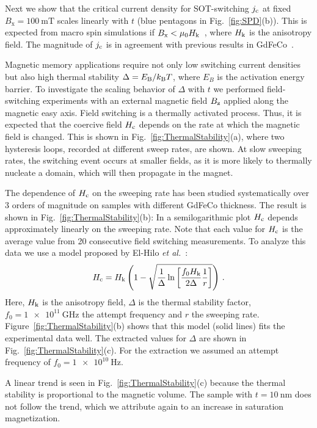 \documentclass[aps,prb,superscriptaddress,sd,reprint]{revtex4-1}
\begin{document}
Next we show that the critical current density for SOT-switching $j_\text c$ at fixed $B_\text{x}=\SI{100}{\milli\tesla}$ scales linearly with $t$ (blue pentagons in Fig.~\ref{fig:SPD}(b)). This is expected from macro spin simulations if $B_\text{x}< \mu_0 H_\text k$~\cite{Lee2013}, where $H_\text k$ is the anisotropy field. The magnitude of $j_\text c$ is in agreement with previous results in GdFeCo~\cite{Roschewsky2016}.

Magnetic memory applications require not only low switching current densities but also high thermal stability $\Delta=E_\text B/k_\text B T$, where $E_B$ is the activation energy barrier. To investigate the scaling behavior of $\Delta$ with $t$ we performed field-switching experiments with an external magnetic field $B_\text z$ applied along the magnetic easy axis. Field switching is a thermally activated process. Thus, it is expected that the coercive field $H_\text c$ depends on the rate at which the magnetic field is changed. This is shown in Fig.~\ref{fig:ThermalStability}(a), where two hysteresis loops, recorded at different sweep rates, are shown. At slow sweeping rates, the switching event occurs at smaller fields, as it is more likely to thermally nucleate a domain, which will then propagate in the magnet.

The dependence of $H_\text c$ on the sweeping rate has been studied systematically over 3 orders of magnitude on samples with different GdFeCo thickness. The result is shown in Fig.~\ref{fig:ThermalStability}(b): In a semilogarithmic plot $H_\text c$ depends approximately linearly on the sweeping rate. Note that each value for $H_\text c$ is the average value from 20 consecutive field switching measurements. To analyze this data we use a model proposed by El-Hilo \textit{et al.}~\cite{ElHilo1992}:
\begin{align}
H_\text c=H_\text k\left(1-\sqrt{\frac{1}{\Delta}\ln\left[\frac{f_0 H_\text k}{2\Delta}\frac{1}{r}\right]}\right)\, .
\end{align}
Here, $H_\text k$ is the anisotropy field, $\Delta$ is the thermal stability factor, $f_0=\SI{1e11}{\giga\hertz}$ the attempt frequency and $r$ the sweeping rate. Figure~\ref{fig:ThermalStability}(b) shows that this model (solid lines) fits the experimental data well. The extracted values for $\Delta$ are shown in Fig.~\ref{fig:ThermalStability}(c). For the extraction we assumed an attempt frequency of $f_0=\SI{1e10}{\hertz}$.

A linear trend is seen in Fig.~\ref{fig:ThermalStability}(c) because the thermal stability is proportional to the magnetic volume. The sample with $t=\SI{10}{\nano\meter}$ does not follow the trend, which we attribute again to an increase in saturation magnetization.
\end{document}
